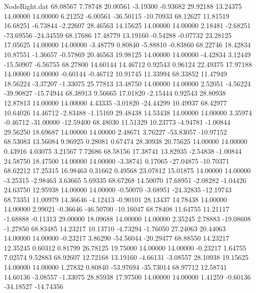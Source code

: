 \begin{filecontents}{NodeRight.dat}
  68.08567    7.78748   20.00561    -3.19300   -0.93682   29.92188   13.24375   14.00000   14.00000    6.21252   -6.00561  -36.50115  -10.70933
  68.12627   11.81519   16.68251    -6.73844   -2.22607   28.46563   14.15625   14.00000   14.00000    2.18481   -2.68251  -73.69556  -24.34559
  68.17686   17.48779   13.19160    -0.54288   -0.07732   23.28125   17.05625   14.00000   14.00000   -3.48779    0.80840   -5.88810   -0.83860
  68.22746   18.42834   10.87551    -1.36657   -0.57869   20.46563   19.98125   14.00000   14.00000   -4.42834    3.12449  -15.50907   -6.56755
  68.27800   14.60144   14.46712     0.92543    0.96124   22.49375   17.97188   14.00000   14.00000   -0.60144   -0.46712   10.91745   11.33994
  68.33852   11.47949   18.56224    -3.37207   -1.33075   25.77813   13.48750   14.00000   14.00000    2.52051   -4.56224  -39.90827  -15.74944
  68.38913    9.56665   17.01820    -2.15444    0.92543   28.80938   12.87813   14.00000   14.00000    4.43335   -3.01820  -24.44299   10.49937
  68.42977   10.64026   14.46712    -2.83488   -1.15169   29.48438   14.53438   14.00000   14.00000    3.35974   -0.46712  -31.00000  -12.59400
  68.48030   11.51329   10.23773    -4.94781   -1.00844   29.56250   18.69687   14.00000   14.00000    2.48671    3.76227  -53.83057  -10.97152
  68.53083   13.56084    9.96925     0.28081    0.67474   28.30938   20.75625   14.00000   14.00000    0.43916    4.03075    3.21567    7.72686
  68.58156   17.38741   13.82935    -2.54838   -1.00844   24.58750   18.47500   14.00000   14.00000   -3.38741    0.17065  -27.04875  -10.70371
  68.62212   17.25315   16.98463     0.31662    0.49568   23.07812   15.01875   14.00000   14.00000   -3.25315   -2.98463    3.63665    5.69335
  68.67268   14.50070   17.68951    -2.08282   -1.04426   24.63750   12.95938   14.00000   14.00000   -0.50070   -3.68951  -24.32835  -12.19743
  68.73351   11.00979   14.36646    -4.12413   -0.90101   28.13437   14.78438   14.00000   14.00000    2.99021   -0.36646  -46.50700  -10.16047
  68.78408   11.64755   11.21117    -1.68888   -0.11313   29.00000   18.09688   14.00000   14.00000    2.35245    2.78883  -19.08608   -1.27850
  68.83485   14.23217   10.13710    -4.73294   -1.76050   27.24063   20.44063   14.00000   14.00000   -0.23217    3.86290  -54.56044  -20.29477
  68.88550   14.23217   12.35245     0.60312    0.81799   26.78125   19.75000   14.00000   14.00000   -0.23217    1.64755    7.02574    9.52883
  68.92607   12.72168   13.19160    -4.66131   -3.08557   28.10938   19.15625   14.00000   14.00000    1.27832    0.80840  -53.97694  -35.73014
  68.97712   12.58741   14.60136    -3.08557   -1.33075   28.85938   17.97500   14.00000   14.00000    1.41259   -0.60136  -34.18527  -14.74356

\end{filecontents}
